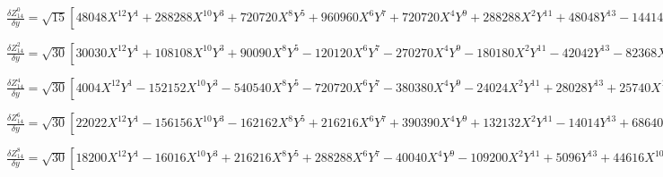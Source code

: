 \documentclass[10pt,landscape]{article}
\begin{document}
\vspace{1.2 mm}
\noindent $ \frac{\delta Z^{0}_{14}}{\delta y} = \sqrt{15} [48048X^{12}Y^{1} +288288X^{10}Y^{3} +720720X^{8}Y^{5} +960960X^{6}Y^{7} +720720X^{4}Y^{9} +288288X^{2}Y^{11} +48048Y^{13} -144144X^{10}Y^{1} -720720X^{8}Y^{3} -1441440X^{6}Y^{5} -1441440X^{4}Y^{7} -720720X^{2}Y^{9} -144144Y^{11} +166320X^{8}Y^{1} +665280X^{6}Y^{3} +997920X^{4}Y^{5} +665280X^{2}Y^{7} +166320Y^{9} -92400X^{6}Y^{1} -277200X^{4}Y^{3} -277200X^{2}Y^{5} -92400Y^{7} +25200X^{4}Y^{1} +50400X^{2}Y^{3} +25200Y^{5} -3024X^{2}Y^{1} -3024Y^{3} +112Y^{1}] $

\vspace{1.2 mm}
\noindent $ \frac{\delta Z^{2}_{14}}{\delta y} = \sqrt{30} [30030X^{12}Y^{1} +108108X^{10}Y^{3} +90090X^{8}Y^{5} -120120X^{6}Y^{7} -270270X^{4}Y^{9} -180180X^{2}Y^{11} -42042Y^{13} -82368X^{10}Y^{1} -205920X^{8}Y^{3} +411840X^{4}Y^{7} +411840X^{2}Y^{9} +123552Y^{11} +83160X^{8}Y^{1} +110880X^{6}Y^{3} -166320X^{4}Y^{5} -332640X^{2}Y^{7} -138600Y^{9} -36960X^{6}Y^{1} +110880X^{2}Y^{5} +73920Y^{7} +6300X^{4}Y^{1} -12600X^{2}Y^{3} -18900Y^{5} +2016Y^{3} -56Y^{1}] $

\vspace{1.2 mm}
\noindent $ \frac{\delta Z^{4}_{14}}{\delta y} = \sqrt{30} [4004X^{12}Y^{1} -152152X^{10}Y^{3} -540540X^{8}Y^{5} -720720X^{6}Y^{7} -380380X^{4}Y^{9} -24024X^{2}Y^{11} +28028Y^{13} +25740X^{10}Y^{1} +437580X^{8}Y^{3} +1081080X^{6}Y^{5} +875160X^{4}Y^{7} +128700X^{2}Y^{9} -77220Y^{11} -47520X^{8}Y^{1} -443520X^{6}Y^{3} -665280X^{4}Y^{5} -190080X^{2}Y^{7} +79200Y^{9} +36960X^{6}Y^{1} +184800X^{4}Y^{3} +110880X^{2}Y^{5} -36960Y^{7} -12600X^{4}Y^{1} -25200X^{2}Y^{3} +7560Y^{5} +1512X^{2}Y^{1} -504Y^{3}] $

\vspace{1.2 mm}
\noindent $ \frac{\delta Z^{6}_{14}}{\delta y} = \sqrt{30} [22022X^{12}Y^{1} -156156X^{10}Y^{3} -162162X^{8}Y^{5} +216216X^{6}Y^{7} +390390X^{4}Y^{9} +132132X^{2}Y^{11} -14014Y^{13} +68640X^{10}Y^{1} +308880X^{8}Y^{3} -617760X^{4}Y^{7} -343200X^{2}Y^{9} +34320Y^{11} -77220X^{8}Y^{1} -166320X^{6}Y^{3} +249480X^{4}Y^{5} +308880X^{2}Y^{7} -29700Y^{9} +36960X^{6}Y^{1} -110880X^{2}Y^{5} +10560Y^{7} -6300X^{4}Y^{1} +12600X^{2}Y^{3} -1260Y^{5}] $

\vspace{1.2 mm}
\noindent $ \frac{\delta Z^{8}_{14}}{\delta y} = \sqrt{30} [18200X^{12}Y^{1} -16016X^{10}Y^{3} +216216X^{8}Y^{5} +288288X^{6}Y^{7} -40040X^{4}Y^{9} -109200X^{2}Y^{11} +5096Y^{13} +44616X^{10}Y^{1} -51480X^{8}Y^{3} -432432X^{6}Y^{5} -102960X^{4}Y^{7} +223080X^{2}Y^{9} -10296Y^{11} -35640X^{8}Y^{1} +110880X^{6}Y^{3} +166320X^{4}Y^{5} -142560X^{2}Y^{7} +6600Y^{9} +9240X^{6}Y^{1} -46200X^{4}Y^{3} +27720X^{2}Y^{5} -1320Y^{7}] $
\end{document}
